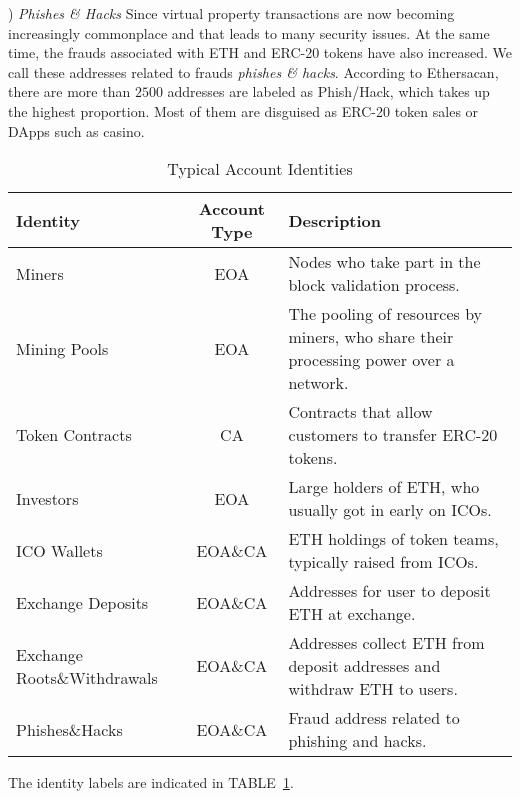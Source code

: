 ) \emph{Phishes \& Hacks}
Since virtual property transactions are now becoming increasingly commonplace and that leads to many security issues. At the same time, the frauds associated with ETH and ERC-20 tokens have also increased. We call these addresses related to frauds \emph{phishes \& hacks}. According to Ethersacan, there are more than $2500$ addresses are labeled as Phish/Hack, which takes up the highest proportion. Most of them are disguised as ERC-20 token sales or DApps such as casino. 

\begin{table}[t]
\caption{Typical Account Identities}
\begin{center}
\begin{tabular}{|p{2.1cm}|c|p{3.9cm}|}
\hline
\textbf{Identity} & \textbf{Account Type}& \textbf{Description} \\
\hline
Miners & EOA & Nodes who take part in the block validation process. \\ \hline
Mining Pools & EOA & The pooling of resources by miners, who share their processing power over a network.\\ \hline
Token Contracts & CA & Contracts that allow customers to transfer ERC-20 tokens. \\ \hline
Investors & EOA & Large holders of ETH, who usually got in early on ICOs. \\ \hline
ICO Wallets & EOA\&CA & ETH holdings of token teams, typically raised from ICOs. \\ \hline
Exchange Deposits & EOA\&CA & Addresses for user to deposit ETH at exchange. \\ \hline
Exchange Roots\&Withdrawals & EOA\&CA & Addresses collect ETH from deposit addresses and withdraw ETH to users. \\ \hline
Phishes\&Hacks & EOA\&CA & Fraud address related to phishing and hacks. \\ \hline
\end{tabular}
\label{identity}
\end{center}
\end{table}


The identity labels are indicated in TABLE~\ref{identity}.




